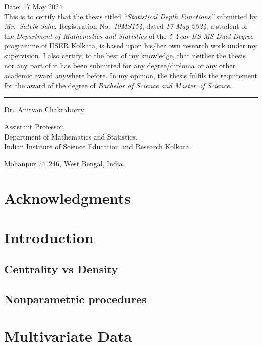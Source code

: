 \documentclass[12pt]{report}
\begin{document}
    Date: 17 May 2024\\

    This is to certify that the thesis titled \emph{``Statistical Depth
    Functions''} submitted by \emph{Mr.~Satvik Saha}, Registration
    No.~\emph{19MS154}, dated \emph{17 May 2024}, a student of the
    \textit{Department of Mathematics and Statistics} of the \textit{5 Year
    BS-MS Dual Degree} programme of IISER Kolkata, is based upon his/her own
    research work under my supervision.
    I also certify, to the best of my knowledge, that neither the thesis nor
    any part of it has been submitted for any degree/diploma or any other
    academic award anywhere before.
    In my opinion, the thesis fulfils the requirement for the award of the
    degree of \emph{Bachelor of Science and Master of Science}.

    \vspace{5em}
    \rule{0.4\textwidth}{0.8pt}

    \vspace{0.1em}
    Dr.~Anirvan Chakraborty

    Assistant Professor,\\
    Department of Mathematics and Statistics,\\
    Indian Institute of Science Education and Research Kolkata.

    Mohanpur 741246, West Bengal, India.



    \chapter*{Acknowledgments}


    \tableofcontents


    \chapter{Introduction}
    

    \section{Centrality vs Density}
    \section{Nonparametric procedures}


    \chapter{Multivariate Data}
    
\end{document}
